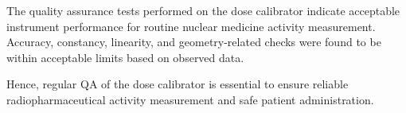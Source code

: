 The quality assurance tests performed on the dose calibrator indicate acceptable instrument performance for routine nuclear medicine activity measurement. Accuracy, constancy, linearity, and geometry-related checks were found to be within acceptable limits based on observed data.

Hence, regular QA of the dose calibrator is essential to ensure reliable radiopharmaceutical activity measurement and safe patient administration.

